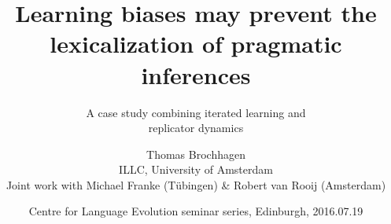 \documentclass{beamer} %
\begin{document}
\renewcommand{\inserttotalframenumber}{27}
\title{Learning biases may prevent the lexicalization of pragmatic inferences}%
\subtitle{A case study combining iterated learning and\\ replicator dynamics }

\author{\center Thomas Brochhagen\\ILLC, University of Amsterdam\\
{\tiny Joint work with Michael Franke (T\"ubingen) \& Robert van Rooij (Amsterdam)}}

\date{\center \scriptsize Centre for Language Evolution seminar series, Edinburgh, 2016.07.19}
\end{document}
